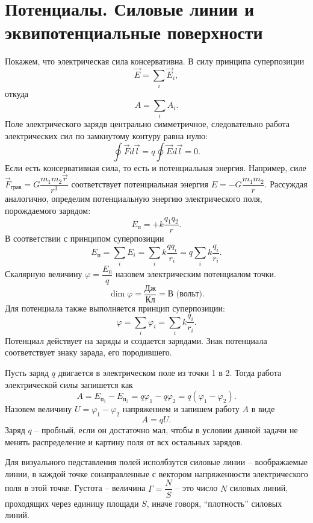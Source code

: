 \section{Потенциалы. Силовые линии и эквипотенциальные поверхности}

	Покажем, что электрическая сила консервативна. В силу принципа суперпозиции
		$$\vec{E}=\sum_i \vec{E}_i,$$
	откуда
		$$A=\sum_i A_i.$$
	Поле электрического зарядв центрально симметричное, следовательно работа электрических сил по замкнутому контуру равна нулю:
		$$\oint \vec{F}d\vec{l}=q\oint \vec{E}d\vec{l}=0.$$
	Если есть консервативная сила, то есть и потенциальная энергия. Например, силе $\vec{F}_{\text{грав}}=G\dfrac{m_1m_2\vec{r}}{r^3}$ соответствует потенциальная энергия $E=-G\dfrac{m_1m_2}{r}$. Рассуждая аналогично, определим потенциальную энергию электрического поля, порождаемого зарядом:
		$$E_{\text{п}}=+k\frac{q_1q_2}{r}.$$
	В соответствии с принципом суперпозиции
		$$E_{\text{п}}=\sum_i E_i=\sum_i k\frac{qq_i}{r_i}=q\sum_i k\frac{q_i}{r_i}.$$
	Скалярную величину $\varphi=\dfrac{E_{\text{п}}}{q}$ назовем электрическим потенциалом точки.
		$$\dim{\varphi}=\frac{\text{Дж}}{\text{Кл}}=\text{В (вольт)}.$$
	Для потенциала также выполняется принцип суперпозиции:
		$$\varphi=\sum_i \varphi_i=\sum_i k\frac{q_i}{r_i}.$$
	Потенциал действует на заряды и создается зарядами. Знак потенциала соответствует знаку зарада, его породившего. \par
	Пусть заряд $q$ двигается в электрическом поле из точки 1 в 2. Тогда работа электрической силы запишется как
		$$A=E_{\text{п}_{\text{1}}}-E_{\text{п}_{\text{2}}}=q\varphi_1-q\varphi_2=q(\varphi_1-\varphi_2).$$
	Назовем величину $U=\varphi_1-\varphi_2$ напряжением и запишем работу $A$ в виде 
		$$A=qU.$$
	Заряд $q$ -- пробный, если он достаточно мал, чтобы в условии данной задачи не менять распределение и картину поля от всх остальных зарядов.\par
	Для визуального педставления полей исполбзутся силовые линии -- воображаемые линии, в каждой точке сонаправленные с вектором напряженности электрического поля в этой точке. Густота -- величина $\Gamma=\dfrac{N}{S}$ -- это число $N$ силовых линий, проходящих через единицу площади $S$, иначе говоря, ``плотность'' силовых линий. 